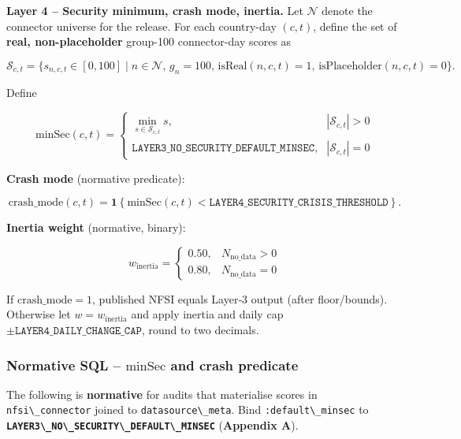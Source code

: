 \documentclass[
  11pt,
  peerreview,journal,onecolumn]{IEEEtran}
\newcommand{\passthrough}[1]{#1}
\begin{document}
\textbf{Layer 4 -- Security minimum, crash mode, inertia.} Let
\(\mathcal{N}\) denote the connector universe for the release. For each
country-day \((c,t)\), define the set of \textbf{real, non-placeholder}
group-100 connector-day scores as

\[\mathcal{S}_{c,t} = \{ s_{n,c,t} \in [0,100] \mid n \in \mathcal{N},\, g_n = 100,\, \mathrm{isReal}(n,c,t)=1,\, \mathrm{isPlaceholder}(n,c,t)=0 \}.\]

Define

\[\mathrm{minSec}(c,t)=
\begin{cases}
\displaystyle\min_{s\in\mathcal{S}_{c,t}} s, & |\mathcal{S}_{c,t}|>0\\
\texttt{LAYER3\_NO\_SECURITY\_DEFAULT\_MINSEC}, & |\mathcal{S}_{c,t}|=0
\end{cases}\]

\textbf{Crash mode} (normative predicate):

\[\mathrm{crash\_mode}(c,t)=\mathbf{1}\left\{\mathrm{minSec}(c,t)<\texttt{LAYER4\_SECURITY\_CRISIS\_THRESHOLD}\right\}.\]

\textbf{Inertia weight} (normative, binary):

\[w_{\mathrm{inertia}} =
\begin{cases}
0.50, & N_{\mathrm{no\_data}} > 0 \\
0.80, & N_{\mathrm{no\_data}} = 0
\end{cases}\]

If \(\mathrm{crash\_mode}=1\), published NFSI equals Layer‑3 output
(after floor/bounds). Otherwise let \(w=w_{\mathrm{inertia}}\) and apply
inertia and daily cap \(\pm\texttt{LAYER4\_DAILY\_CHANGE\_CAP}\), round
to two decimals.

\hypertarget{normative-sql-mathrmminsec-and-crash-predicate}{%
\subsubsection{\texorpdfstring{Normative SQL -- \(\mathrm{minSec}\) and
crash
predicate}{Normative SQL -- \textbackslash mathrm\{minSec\} and crash predicate}}\label{normative-sql-mathrmminsec-and-crash-predicate}}

The following is \textbf{normative} for audits that materialise scores
in \passthrough{\lstinline!nfsi\_connector!} joined to
\passthrough{\lstinline!datasource\_meta!}. Bind
\passthrough{\lstinline!:default\_minsec!} to
\textbf{\passthrough{\lstinline!LAYER3\_NO\_SECURITY\_DEFAULT\_MINSEC!}}
(\textbf{Appendix A}).
\end{document}
